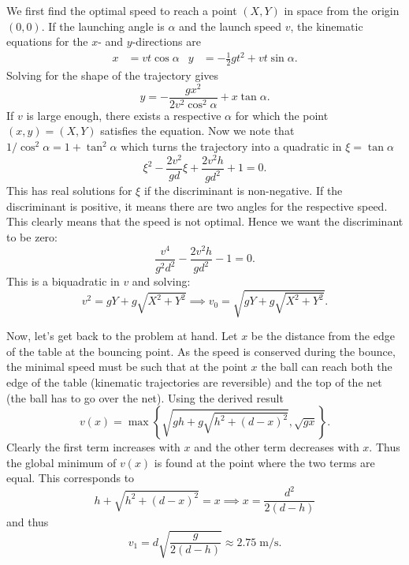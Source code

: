 \begin{solution}
We first find the optimal speed to reach a point $(X,Y)$ in space from the origin $(0,0).$ If the launching angle is $\alpha$ and the launch speed $v$, the kinematic equations for the $x$- and $y$-directions are 
\begin{align*}
    x&=vt\cos\alpha & y&=-\frac 12 gt^2+vt\sin\alpha.
\end{align*}
Solving for the shape of the trajectory gives
\[y=-\frac{gx^2}{2v^2\cos^2\alpha}+x\tan\alpha.\]
If $v$ is large enough, there exists a respective $\alpha$ for which the point $(x,y)=(X,Y)$ satisfies the equation. Now we note that $1/\cos^2\alpha=1+\tan^2\alpha$ which turns the trajectory into a quadratic in $\xi=\tan\alpha$
\[\xi^2-\frac{2v^2}{gd}\xi+\frac{2v^2h}{gd^2}+1=0.\]
This has real solutions for $\xi$ if the discriminant is non-negative. If the discriminant is positive, it means there are two angles for the respective speed. This clearly means that the speed is not optimal. Hence we want the discriminant to be zero:
\[\frac{v^4}{g^2d^2}-\frac{2v^2h}{gd^2}-1=0.\]
This is a biquadratic in $v$ and solving:
\[v^2=gY+g\sqrt{X^2+Y^2}\implies v_0=\sqrt{gY+g\sqrt{X^2+Y^2}}.\]

Now, let's get back to the problem at hand. Let $x$ be the distance from the edge of the table at the bouncing point. As the speed is conserved during the bounce, the minimal speed must be such that at the point $x$ the ball can reach both the edge of the table (kinematic trajectories are reversible) and the top of the net (the ball has to go over the net). Using the derived result
\[v(x)=\max\left\{\sqrt{gh+g\sqrt{h^2+(d-x)^2}},\sqrt{gx}\right\}.\]
Clearly the first term increases with $x$ and the other term decreases with $x$. Thus the global minimum of $v(x)$ is found at the point where the two terms are equal. This corresponds to
\[h+\sqrt{h^2+(d-x)^2}=x\implies x=\frac{d^2}{2(d-h)}\]
and thus
\[v_1=d\sqrt{\frac{g}{2(d-h)}}\approx2.75\;\mathrm{m/s}.\]
\end{solution}